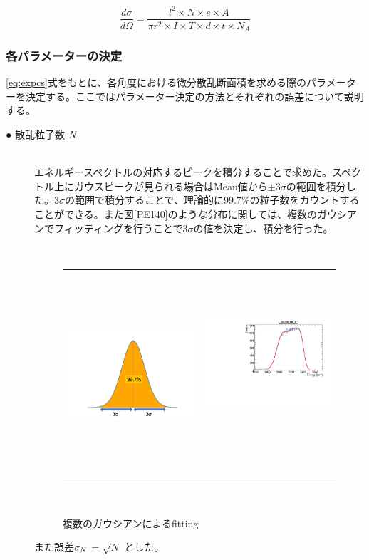 \documentclass[a4paper,11pt,dvipdfmx]{jsarticle}
\begin{document}
\begin{equation}
    \frac{d\sigma}{d\Omega} = \frac{l^2 \times N \times e \times A}{\pi{r^2} \times I \times T \times d \times t \times N_A}
    \label{eq:expcs}
\end{equation}


\newpage
\subsubsection{各パラメーターの決定}
\eqref{eq:expcs}式をもとに、各角度における微分散乱断面積を求める際のパラメーターを決定する。ここではパラメーター決定の方法とそれぞれの誤差について説明する。

\begin{description}
   \item[● 散乱粒子数 ${\it N}$]\mbox{}\\
   エネルギースペクトルの対応するピークを積分することで求めた。スペクトル上にガウスピークが見られる場合はMean値から$\pm3\sigma$の範囲を積分した。3$\sigma$の範囲で積分することで、理論的に99.7\%の粒子数をカウントすることができる。また図\ref{PE140}のような分布に関しては、複数のガウシアンでフィッティングを行うことで$3\sigma$の値を決定し、積分を行った。 
   
   \vspace*{5mm}
   
    \begin{figure}[H]
    　\begin{tabular}{cc}
      　\begin{minipage}[t]{0.45\hsize}
        \centering
        \includegraphics[width=60mm,height=42mm]{picture/CS/3sigma.png}
        \caption{ガウシアンにおける3$\sigma$}
        \label{3sigma}
      　\end{minipage} &
      　\begin{minipage}[t]{0.45\hsize}
        \centering
        \includegraphics[width=60mm,height=42mm]{picture/CS/PE120_140_1.pdf}
        \caption{複数のガウシアンによるfitting}
        \label{triplegauss}
      　\end{minipage}
    　\end{tabular}
  　\end{figure}
  また誤差${\it \sigma_N}$ = $\sqrt{N}$ とした。\\
   

\end{description}
\end{document}
